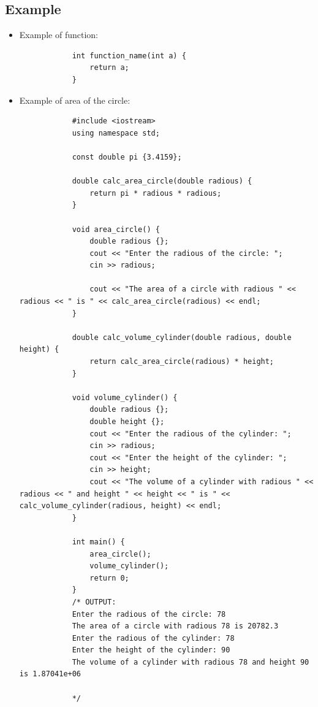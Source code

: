 \subsection{Example}
\begin{itemize}
    \item Example of function:
        \begin{verbatim}
            int function_name(int a) {
                return a;
            }
        \end{verbatim}
    
    \item Example of area of the circle:
        \begin{verbatim}
            #include <iostream>
            using namespace std;

            const double pi {3.4159};

            double calc_area_circle(double radious) {
                return pi * radious * radious;
            }

            void area_circle() {
                double radious {};
                cout << "Enter the radious of the circle: ";
                cin >> radious;

                cout << "The area of a circle with radious " << radious << " is " << calc_area_circle(radious) << endl;
            }

            double calc_volume_cylinder(double radious, double height) {
                return calc_area_circle(radious) * height;
            }

            void volume_cylinder() {
                double radious {};
                double height {};
                cout << "Enter the radious of the cylinder: ";
                cin >> radious;
                cout << "Enter the height of the cylinder: ";
                cin >> height;
                cout << "The volume of a cylinder with radious " << radious << " and height " << height << " is " << calc_volume_cylinder(radious, height) << endl;
            }

            int main() {
                area_circle();
                volume_cylinder();
                return 0;
            }
            /* OUTPUT:
            Enter the radious of the circle: 78
            The area of a circle with radious 78 is 20782.3
            Enter the radious of the cylinder: 78
            Enter the height of the cylinder: 90
            The volume of a cylinder with radious 78 and height 90 is 1.87041e+06

            */
        \end{verbatim}
\end{itemize}


